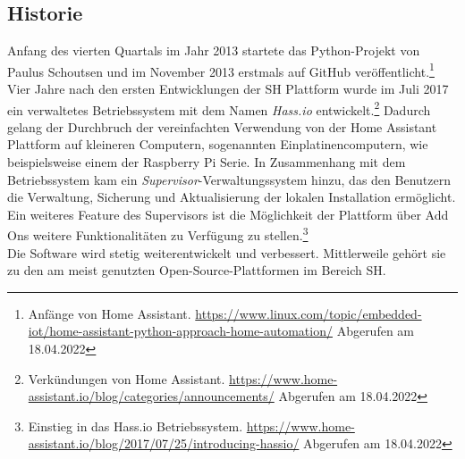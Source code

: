     \subsection*{Historie}
    \label{sec:historyHOAS}
        Anfang des vierten Quartals im Jahr 2013 startete das Python-Projekt von Paulus Schoutsen und im November 2013 erstmals auf GitHub 
        veröffentlicht.\footnote{Anfänge von Home Assistant. \url{https://www.linux.com/topic/embedded-iot/home-assistant-python-approach-home-automation/} Abgerufen am 18.04.2022}
        \\
        \linebreak
        Vier Jahre nach den ersten Entwicklungen der \acl{SH} Plattform wurde im Juli 2017 ein verwaltetes Betriebssystem mit dem Namen 
        \textit{Hass.io} entwickelt.\footnote{Verkündungen von Home Assistant. \url{https://www.home-assistant.io/blog/categories/announcements/} Abgerufen am 18.04.2022} 
        Dadurch gelang der Durchbruch der vereinfachten Verwendung von der Home Assistant Plattform auf kleineren Computern, sogenannten 
        Einplatinencomputern, wie beispielsweise einem der Raspberry Pi Serie. In Zusammenhang mit dem Betriebssystem kam ein 
        \textit{Supervisor}-Verwaltungssystem hinzu, das den Benutzern die Verwaltung, Sicherung und Aktualisierung der lokalen Installation 
        ermöglicht. Ein weiteres Feature des Supervisors ist die Möglichkeit der Plattform über Add Ons weitere Funktionalitäten zu Verfügung zu 
        stellen.\footnote{Einstieg in das Hass.io Betriebssystem. \url{https://www.home-assistant.io/blog/2017/07/25/introducing-hassio/} Abgerufen am 18.04.2022}
        \\
        \linebreak
        Die Software wird stetig weiterentwickelt und verbessert. Mittlerweile gehört sie zu den am meist genutzten Open-Source-Plattformen 
        im Bereich \acl{SH}.

